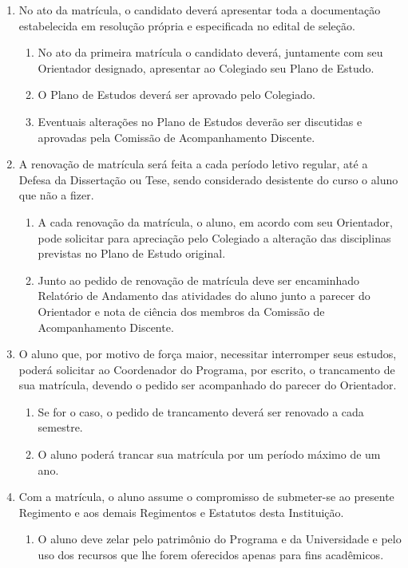 \documentclass{article}
\newcommand{\singleitem}{\item[Parágrafo Único.]}
\begin{document}
\begin{enumerate}
	\item No ato da matrícula, o candidato deverá apresentar toda a documentação estabelecida em resolução própria e especificada no edital de seleção.
	\begin{enumerate}
		\item No ato da primeira matrícula o candidato deverá, juntamente com seu Orientador designado, apresentar ao Colegiado seu Plano de Estudo.
		\item O Plano de Estudos deverá ser aprovado pelo Colegiado.
		\item Eventuais alterações no Plano de Estudos deverão ser discutidas e aprovadas pela Comissão de Acompanhamento Discente.
	\end{enumerate}

	\item A renovação de matrícula será feita a cada período letivo regular, até a Defesa da Dissertação ou Tese, sendo considerado desistente do curso o aluno que não a fizer.
	\begin{enumerate}
		\item A cada renovação da matrícula, o aluno, em acordo com seu Orientador, pode solicitar para apreciação pelo Colegiado a alteração das disciplinas previstas no Plano de Estudo original.
		\item Junto ao pedido de renovação de matrícula deve ser encaminhado Relatório de Andamento das atividades do aluno junto a parecer do Orientador e nota de ciência dos membros da Comissão de Acompanhamento Discente.
	\end{enumerate}

	\item O aluno que, por motivo de força maior, necessitar interromper seus estudos, poderá solicitar ao Coordenador do Programa, por escrito, o trancamento de sua matrícula, devendo o pedido ser acompanhado do parecer do Orientador.
	\begin{enumerate}
		\item Se for o caso, o pedido de trancamento deverá ser renovado a cada semestre.
		\item O aluno poderá trancar sua matrícula por um período máximo de um ano.
	\end{enumerate}

	\item Com a matrícula, o aluno assume o compromisso de submeter-se ao presente Regimento e aos demais Regimentos e Estatutos desta Instituição.
	\begin{enumerate}
		\singleitem O aluno deve zelar pelo patrimônio do Programa e da Universidade e pelo uso dos recursos que lhe forem oferecidos apenas para fins acadêmicos.
	\end{enumerate}
\end{enumerate}
\end{document}
